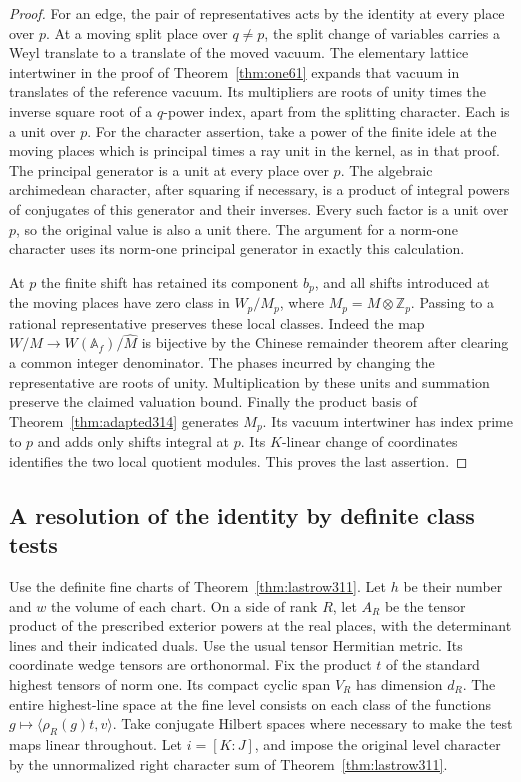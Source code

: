 \documentclass[a4paper,11pt]{article}
\theoremstyle{definition}
\theoremstyle{remark}
\newcommand{\ZZ}{\mathbb Z}\newcommand{\ord}{\operatorname{ord}}
\numberwithin{equation}{section}
\begin{document}
\begin{proof}
For an edge, the pair of representatives acts by the identity at
every place over \(p\). At a moving split place over \(q\ne p\),
the split change of variables carries a Weyl translate to a
translate of the moved vacuum. The elementary lattice intertwiner
in the proof of Theorem~\ref{thm:one61} expands that vacuum in
translates of the reference vacuum. Its multipliers are roots of
unity times the inverse square root of a \(q\)-power index,
apart from the splitting character. Each is a unit over \(p\).
For the character assertion, take a power of the finite idele
at the moving places which is principal times a ray unit in
the kernel, as in that proof. The principal generator is a
unit at every place over \(p\). The algebraic archimedean
character, after squaring if necessary, is a product of integral
powers of conjugates of this generator and their inverses. Every
such factor is a unit over \(p\), so the original value is also
a unit there. The argument for a norm-one character uses its
norm-one principal generator in exactly this calculation.

At \(p\) the finite shift has retained its component \(b_p\),
and all shifts introduced at the moving places have zero class
in \(W_p/M_p\), where \(M_p=M\otimes\ZZ_p\). Passing to a rational
representative preserves these local classes. Indeed the map
\(W/M\to W(\mathbb A_f)/\widehat M\) is bijective by the Chinese
remainder theorem after clearing a common integer denominator.
The phases incurred by changing the representative are roots of
unity. Multiplication by these units and summation preserve the
claimed valuation bound. Finally the product basis of
Theorem~\ref{thm:adapted314} generates \(M_p\). Its vacuum
intertwiner has index prime to \(p\) and adds only shifts integral
at \(p\). Its \(K\)-linear change of coordinates identifies the
two local quotient modules. This proves the last assertion.
\end{proof}

\subsection{A resolution of the identity by definite class tests}\label{nav:V-64}
Use the definite fine charts of Theorem~\ref{thm:lastrow311}.
Let \(h\) be their number and \(w\) the volume of each chart.
On a side of rank \(R\), let \(A_R\) be the tensor product of
the prescribed exterior powers at the real places, with the
determinant lines and their indicated duals. Use the usual
tensor Hermitian metric. Its coordinate wedge tensors are
orthonormal. Fix the product \(t\) of the standard highest
tensors of norm one. Its compact cyclic span \(V_R\) has
dimension \(d_R\). The entire highest-line space at the fine
level consists on each class of the functions
\(g\mapsto\langle\rho_R(g)t,v\rangle\).
Take conjugate Hilbert spaces where necessary to make the
test maps linear throughout. Let \(i=[K:J]\), and impose
the original level character by the unnormalized right
character sum of Theorem~\ref{thm:lastrow311}.
\end{document}
